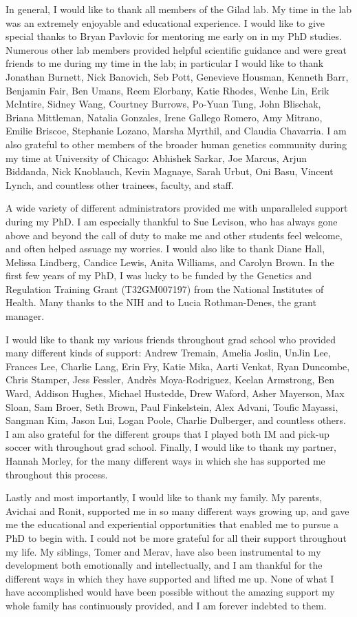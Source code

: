 In general, I would like to thank all members of the Gilad lab. My time in the lab was an extremely enjoyable and educational experience. I would like to give special thanks to Bryan Pavlovic for mentoring me early on in my PhD studies. Numerous other lab members provided helpful scientific guidance and were great friends to me during my time in the lab; in particular I would like to thank Jonathan Burnett, Nick Banovich, Seb Pott, Genevieve Housman, Kenneth Barr, Benjamin Fair, Ben Umans, Reem Elorbany, Katie Rhodes, Wenhe Lin, Erik McIntire, Sidney Wang, Courtney Burrows, Po-Yuan Tung, John Blischak, Briana Mittleman, Natalia Gonzales, Irene Gallego Romero, Amy Mitrano, Emilie Briscoe, Stephanie Lozano, Marsha Myrthil, and Claudia Chavarria. I am also grateful to other members of the broader human genetics community during my time at University of Chicago:  Abhishek Sarkar, Joe Marcus, Arjun Biddanda, Nick Knoblauch, Kevin Magnaye, Sarah Urbut, Oni Basu, Vincent Lynch, and countless other trainees, faculty, and staff.

A wide variety of different administrators provided me with unparalleled support during my PhD. I am especially thankful to Sue Levison, who has always gone above and beyond the call of duty to make me and other students feel welcome, and often helped assuage my worries. I would also like to thank Diane Hall, Melissa Lindberg, Candice Lewis, Anita Williams, and Carolyn Brown. In the first few years of my PhD, I was lucky to be funded by the Genetics and Regulation Training Grant (T32GM007197) from the National Institutes of Health. Many thanks to the NIH and to Lucia Rothman-Denes, the grant manager.

I would like to thank my various friends throughout grad school who provided many different kinds of support: Andrew Tremain, Amelia Joslin, UnJin Lee, Frances Lee, Charlie Lang, Erin Fry, Katie Mika, Aarti Venkat, Ryan Duncombe, Chris Stamper, Jess Fessler, Andr\`es Moya-Rodriguez, Keelan Armstrong, Ben Ward, Addison Hughes, Michael Hustedde, Drew Waford, Asher Mayerson, Max Sloan, Sam Broer, Seth Brown, Paul Finkelstein, Alex Advani, Toufic Mayassi, Sangman Kim, Jason Lui, Logan Poole, Charlie Dulberger, and countless others. I am also grateful for the different groups that I played both IM and pick-up soccer with throughout grad school. Finally, I would like to thank my partner, Hannah Morley, for the many different ways in which she has supported me throughout this process.

Lastly and most importantly, I would like to thank my family. My parents, Avichai and Ronit, supported me in so many different ways growing up, and gave me the educational and experiential opportunities that enabled me to pursue a PhD to begin with. I could not be more grateful for all their support throughout my life. My siblings, Tomer and Merav, have also been instrumental to my development both emotionally and intellectually, and I am thankful for the different ways in which they have supported and lifted me up. None of what I have accomplished would have been possible without the amazing support my whole family has continuously provided, and I am forever indebted to them.